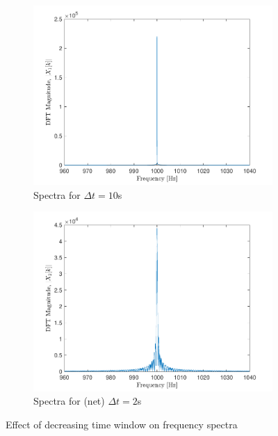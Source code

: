 \documentclass[10pt]{article}
\begin{document}
\begin{figure}[ht]
    \centering
    \begin{subfigure}[b]{0.48\textwidth}
        \includegraphics[width=\textwidth]{problem2_fft_high_dur.pdf}
        \caption{Spectra for $\Delta t=10$s}
    \end{subfigure}
    \quad
    \begin{subfigure}[b]{0.48\textwidth}
        \includegraphics[width=\textwidth]{problem2_fft_low_dur.pdf}
        \caption{Spectra for (net) $\Delta t=2$s}
    \end{subfigure}
    \caption{Effect of decreasing time window on frequency spectra\vspace{-0.5cm}}
    \label{time_bandwidth_tradeoff}
\end{figure}
\end{document}
